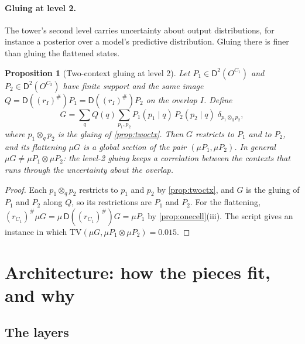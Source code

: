\documentclass[11pt]{article}
\newtheorem{proposition}[theorem]{Proposition}
\theoremstyle{definition}
\theoremstyle{remark}
\newcommand{\D}{\mathsf{D}}
\newcommand{\TV}{\mathrm{TV}}
\begin{document}
\paragraph{Gluing at level 2.} The tower's second level carries uncertainty about output
distributions, for instance a posterior over a model's predictive distribution. Gluing there is
finer than gluing the flattened states.

\begin{proposition}[Two-context gluing at level 2]\label{prop:level2}
Let $P_1\in\D^2(O^{C_1})$ and $P_2\in\D^2(O^{C_2})$ have finite support and the same image
$Q=\D((r_I)^\#)P_1=\D((r_I)^\#)P_2$ on the overlap $I$. Define
\[
G=\sum_q Q(q)\sum_{p_1,p_2}P_1(p_1\mid q)\,P_2(p_2\mid q)\;\delta_{p_1\otimes_qp_2},
\]
where $p_1\otimes_qp_2$ is the gluing of \cref{prop:twoctx}. Then $G$ restricts to $P_1$ and to $P_2$,
and its flattening $\mu G$ is a global section of the pair $(\mu P_1,\mu P_2)$. In general
$\mu G\ne\mu P_1\otimes\mu P_2$: the level-2 gluing keeps a correlation between the contexts that runs
through the uncertainty about the overlap.
\end{proposition}
\begin{proof}
Each $p_1\otimes_qp_2$ restricts to $p_1$ and $p_2$ by \cref{prop:twoctx}, and $G$ is the gluing of
$P_1$ and $P_2$ along $Q$, so its restrictions are $P_1$ and $P_2$. For the flattening,
$(r_{C_1})^\#\mu G=\mu\,\D((r_{C_1})^\#)G=\mu P_1$ by \cref{prop:onecell}(iii). The script gives an
instance in which $\TV(\mu G,\mu P_1\otimes\mu P_2)=0.015$.
\end{proof}

\section{Architecture: how the pieces fit, and why}\label{sec:architecture}

\subsection{The layers}
\end{document}
